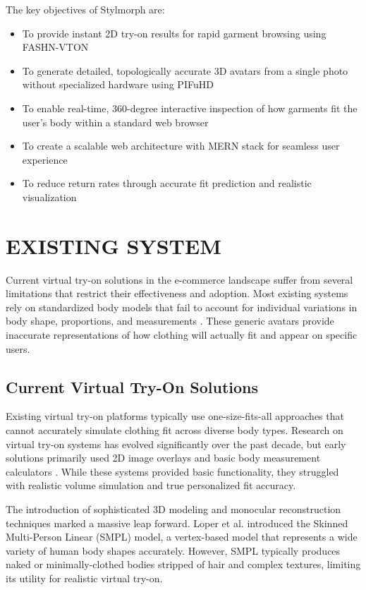 \documentclass[12pt,a4paper,oneside]{report}
\begin{document}
The key objectives of Stylmorph are:
\begin{itemize}
    \item To provide instant 2D try-on results for rapid garment browsing using FASHN-VTON \cite{16}
    \item To generate detailed, topologically accurate 3D avatars from a single photo without specialized hardware using PIFuHD \cite{1}
    \item To enable real-time, 360-degree interactive inspection of how garments fit the user's body within a standard web browser \cite{6}
    \item To create a scalable web architecture with MERN stack for seamless user experience \cite{19}
    \item To reduce return rates through accurate fit prediction and realistic visualization \cite{5}
\end{itemize}

\chapter{EXISTING SYSTEM}

Current virtual try-on solutions in the e-commerce landscape suffer from several limitations that restrict their effectiveness and adoption. Most existing systems rely on standardized body models that fail to account for individual variations in body shape, proportions, and measurements \cite{2, 11}. These generic avatars provide inaccurate representations of how clothing will actually fit and appear on specific users.

\section{Current Virtual Try-On Solutions}

Existing virtual try-on platforms typically use one-size-fits-all approaches that cannot accurately simulate clothing fit across diverse body types. Research on virtual try-on systems has evolved significantly over the past decade, but early solutions primarily used 2D image overlays and basic body measurement calculators \cite{17, 18}. While these systems provided basic functionality, they struggled with realistic volume simulation and true personalized fit accuracy.

The introduction of sophisticated 3D modeling and monocular reconstruction techniques marked a massive leap forward. Loper et al. \cite{2} introduced the Skinned Multi-Person Linear (SMPL) model, a vertex-based model that represents a wide variety of human body shapes accurately. However, SMPL typically produces naked or minimally-clothed bodies stripped of hair and complex textures, limiting its utility for realistic virtual try-on.
\end{document}
